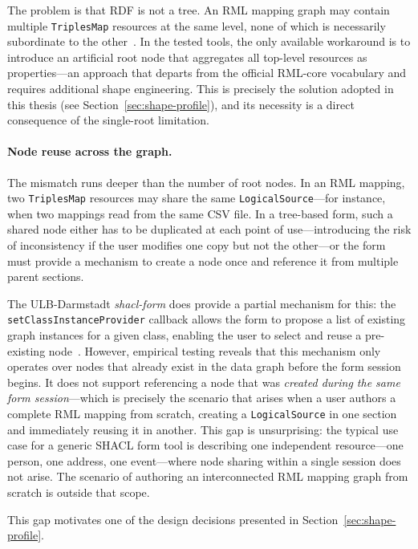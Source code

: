 The problem is that RDF is not a tree.
An RML mapping graph may contain multiple \texttt{TriplesMap} resources at the same level, none of which is necessarily subordinate to the other~\cite{rml-core}.
In the tested tools, the only available workaround is to introduce an artificial root node that aggregates all top-level resources as properties---an approach that departs from the official RML-core vocabulary and requires additional shape engineering.
This is precisely the solution adopted in this thesis (see Section~\ref{sec:shape-profile}), and its necessity is a direct consequence of the single-root limitation.

\paragraph{Node reuse across the graph.}
The mismatch runs deeper than the number of root nodes.
In an RML mapping, two \texttt{TriplesMap} resources may share the same \texttt{LogicalSource}---for instance, when two mappings read
from the same CSV file.
In a tree-based form, such a shared node either has to be duplicated at each point of use---introducing the risk of inconsistency if the
user modifies one copy but not the other---or the form must provide a mechanism to create a node once and reference it from multiple parent sections.

The ULB-Darmstadt \textit{shacl-form} does provide a partial mechanism for this: the \texttt{setClassInstanceProvider} callback
allows the form to propose a list of existing graph instances for a given class, enabling the user to select and reuse a pre-existing node~\cite{ulb-darmstadt-shacl-form}.
However, empirical testing reveals that this mechanism only operates over nodes that already exist in the data graph before the form session begins.
It does not support referencing a node that was \emph{created during the same form session}---which is precisely the scenario that arises when a user authors a complete RML mapping from scratch, creating a \texttt{LogicalSource} in one section and immediately reusing it in another.
This gap is unsurprising: the typical use case for a generic SHACL form tool is describing one independent resource---one person, one address, one event---where node sharing within a single session does not arise. The scenario of authoring an interconnected RML mapping graph from scratch is outside that scope.

This gap motivates one of the design decisions presented in Section~\ref{sec:shape-profile}.

